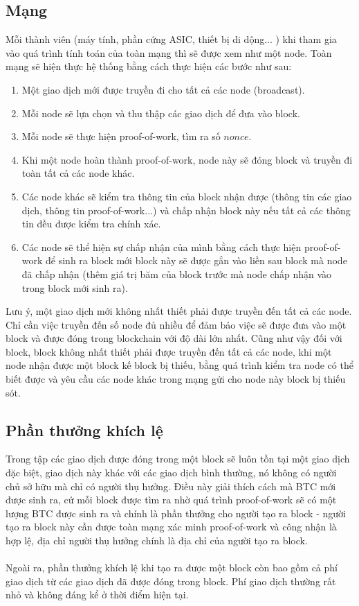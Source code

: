 \subsection{Mạng}
Mỗi thành viên (máy tính, phần cứng ASIC, thiết bị di dộng... ) khi tham gia vào quá 
trình tính toán của toàn mạng thì sẽ được xem như một node. Toàn mạng sẽ hiện thực hệ 
thống bằng cách thực hiện các bước như sau:
\begin{enumerate}
\item Một giao dịch mới được truyền đi cho tất cả các node (broadcast).
\item Mỗi node sẽ lựa chọn và thu thập các giao dịch để đưa vào block.
\item Mỗi node sẽ thực hiện proof-of-work, tìm ra số $nonce$.
\item Khi một node hoàn thành proof-of-work, node này sẽ đóng block và truyền 
đi toàn tất cả các node khác.
\item Các node khác sẽ kiểm tra thông tin của block nhận được (thông tin các 
giao dịch, thông tin proof-of-work...) và chấp nhận block này nếu tất cả 
các thông tin đều được kiểm tra chính xác.
\item Các node sẽ thể hiện sự chấp nhận của mình bằng cách thực hiện proof-of-work 
để sinh ra block mới block này sẽ được gắn vào liền sau block mà node đã chấp nhận 
(thêm giá trị băm của block trước mà node chấp nhận vào trong block mới sinh ra).
\end{enumerate}
Lưu ý, một giao dịch mới không nhất thiết phải được truyền đến tất cả các node. 
Chỉ cần việc truyền đến số node đủ nhiều để đảm bảo việc sẽ được đưa vào một block 
và được đóng trong blockchain với độ dài lớn nhất. Cũng như vậy đối với block, 
block không nhất thiết phải được truyền đến tất cả các node, khi một node nhận 
được một block kế block bị thiếu, bằng quá trình kiểm tra node có thể biết được 
và yêu cầu các node khác trong mạng gửi cho node này block bị thiếu sót.
\subsection{Phần thưởng khích lệ}
Trong tập các giao dịch được đóng trong một block sẽ luôn tồn tại một giao dịch 
đặc biệt, giao dịch này khác với các giao dịch bình thường, nó không có người chủ 
sở hữu mà chỉ có người thụ hưởng. Điều này giải thích cách mà BTC mới được sinh 
ra, cứ mỗi block được tìm ra nhờ quá trình proof-of-work sẽ có một lượng BTC 
được sinh ra và chính là phần thưởng cho người tạo ra block - người tạo ra block 
này cần được toàn mạng xác minh proof-of-work và công nhận là hợp lệ, địa chỉ 
người thụ hưởng chính là địa chỉ của người tạo ra block.\\\\
Ngoài ra, phần thưởng khích lệ khi tạo ra được một block còn bao gồm cả phí giao 
dịch từ các giao dịch đã được đóng trong block. Phí giao dịch thường rất nhỏ và
không đáng kể ở thời điểm hiện tại.
